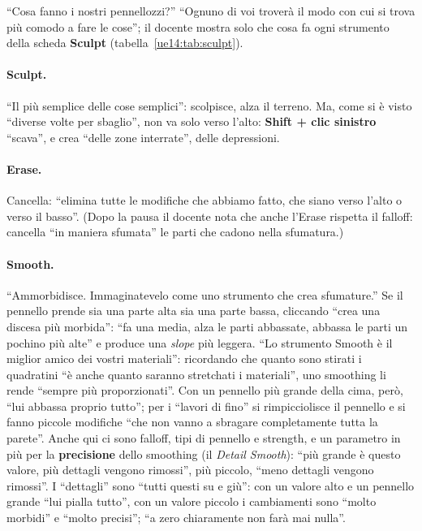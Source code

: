 ``Cosa fanno i nostri pennellozzi?'' ``Ognuno di voi troverà il modo con cui si trova più
comodo a fare le cose''; il docente mostra solo che cosa fa ogni strumento della scheda
\textbf{Sculpt} (tabella~\ref{ue14:tab:sculpt}).

\paragraph{Sculpt.} ``Il più semplice delle cose semplici'': scolpisce, alza il terreno. Ma,
come si è visto ``diverse volte per sbaglio'', non va solo verso l'alto: \textbf{Shift +
clic sinistro} ``scava'', e crea ``delle zone interrate'', delle depressioni.

\paragraph{Erase.} Cancella: ``elimina tutte le modifiche che abbiamo fatto, che siano verso
l'alto o verso il basso''. (Dopo la pausa il docente nota che anche l'Erase rispetta il
falloff: cancella ``in maniera sfumata'' le parti che cadono nella sfumatura.)

\paragraph{Smooth.} ``Ammorbidisce. Immaginatevelo come uno strumento che crea
sfumature.'' Se il pennello prende sia una parte alta sia una parte bassa, cliccando ``crea
una discesa più morbida'': ``fa una media, alza le parti abbassate, abbassa le parti un
pochino più alte'' e produce una \emph{slope} più leggera. ``Lo strumento Smooth è il miglior
amico dei vostri materiali'': ricordando che quanto sono stirati i quadratini ``è anche quanto
saranno stretchati i materiali'', uno smoothing li rende ``sempre più proporzionati''. Con un
pennello più grande della cima, però, ``lui abbassa proprio tutto''; per i ``lavori di fino''
si rimpicciolisce il pennello e si fanno piccole modifiche ``che non vanno a sbragare
completamente tutta la parete''. Anche qui ci sono falloff, tipi di pennello e strength, e
un parametro in più per la \textbf{precisione} dello smoothing (il \emph{Detail Smooth}):
``più grande è questo valore, più dettagli vengono rimossi'', più piccolo, ``meno dettagli
vengono rimossi''. I ``dettagli'' sono ``tutti questi su e giù'': con un valore alto e un
pennello grande ``lui pialla tutto'', con un valore piccolo i cambiamenti sono ``molto
morbidi'' e ``molto precisi''; ``a zero chiaramente non farà mai nulla''.

